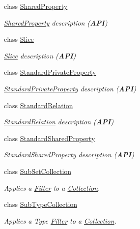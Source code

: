 \begin{DoxyCompactItemize}
class \mbox{\hyperlink{classHurricane_1_1SharedProperty}{Shared\+Property}}
\begin{DoxyCompactList}\small\item\em \mbox{\hyperlink{classHurricane_1_1SharedProperty}{Shared\+Property}} description ({\bfseries A\+PI}) \end{DoxyCompactList}\item 
class \mbox{\hyperlink{classHurricane_1_1Slice}{Slice}}
\begin{DoxyCompactList}\small\item\em \mbox{\hyperlink{classHurricane_1_1Slice}{Slice}} description ({\bfseries A\+PI}) \end{DoxyCompactList}\item 
class \mbox{\hyperlink{classHurricane_1_1StandardPrivateProperty}{Standard\+Private\+Property}}
\begin{DoxyCompactList}\small\item\em \mbox{\hyperlink{classHurricane_1_1StandardPrivateProperty}{Standard\+Private\+Property}} description ({\bfseries A\+PI}) \end{DoxyCompactList}\item 
class \mbox{\hyperlink{classHurricane_1_1StandardRelation}{Standard\+Relation}}
\begin{DoxyCompactList}\small\item\em \mbox{\hyperlink{classHurricane_1_1StandardRelation}{Standard\+Relation}} description ({\bfseries A\+PI}) \end{DoxyCompactList}\item 
class \mbox{\hyperlink{classHurricane_1_1StandardSharedProperty}{Standard\+Shared\+Property}}
\begin{DoxyCompactList}\small\item\em \mbox{\hyperlink{classHurricane_1_1StandardSharedProperty}{Standard\+Shared\+Property}} description ({\bfseries A\+PI}) \end{DoxyCompactList}\item 
class \mbox{\hyperlink{classHurricane_1_1SubSetCollection}{Sub\+Set\+Collection}}
\begin{DoxyCompactList}\small\item\em Applies a \mbox{\hyperlink{classHurricane_1_1Filter}{Filter}} to a \mbox{\hyperlink{classHurricane_1_1Collection}{Collection}}. \end{DoxyCompactList}\item 
class \mbox{\hyperlink{classHurricane_1_1SubTypeCollection}{Sub\+Type\+Collection}}
\begin{DoxyCompactList}\small\item\em Applies a Type \mbox{\hyperlink{classHurricane_1_1Filter}{Filter}} to a \mbox{\hyperlink{classHurricane_1_1Collection}{Collection}}. \end{DoxyCompactList}\item 

\end{DoxyCompactItemize}
